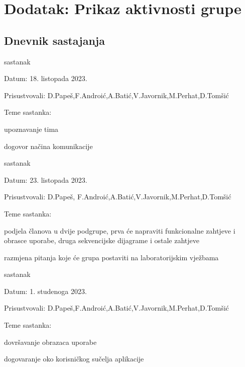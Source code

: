 \chapter*{Dodatak: Prikaz aktivnosti grupe}
		
		\section*{Dnevnik sastajanja}
		
		\begin{packed_enum}
			\item  sastanak
			
			\item[] \begin{packed_item}
				\item Datum: 18. listopada 2023.
				\item Prisustvovali: D.Papeš,F.Androić,A.Batić,V.Javornik,M.Perhat,D.Tomšić
				\item Teme sastanka:
				\begin{packed_item}
					\item upoznavanje tima
					\item dogovor načina komunikacije
				\end{packed_item}
			\end{packed_item}
			
			\item  sastanak
			\item[] \begin{packed_item}
				\item Datum: 23. listopada 2023.
				\item Prisustvovali: D.Papeš, F.Androić,A.Batić,V.Javornik,M.Perhat,D.Tomšić
				\item Teme sastanka:
				\begin{packed_item}
					\item podjela članova u dvije podgrupe, prva će napraviti funkcionalne zahtjeve i obrasce uporabe, druga sekvencijske dijagrame i ostale zahtjeve
					\item razmjena pitanja koje će grupa postaviti na laboratorijskim vježbama
				\end{packed_item}
			\end{packed_item}
			
			\item  sastanak
			\item[] \begin{packed_item}
				\item Datum: 1. studenoga 2023.
				\item Prisustvovali: D.Papeš,F.Androić,A.Batić,V.Javornik,M.Perhat,D.Tomšić
				\item Teme sastanka:
				\begin{packed_item}
					\item dovršavanje obrazaca uporabe
					\item dogovaranje oko korisničkog sučelja aplikacije
				\end{packed_item}
			\end{packed_item}
			

\end{packed_enum}
